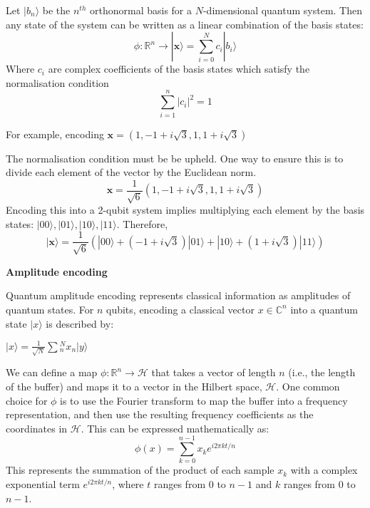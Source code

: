 Let $\vert b_n \rangle$ be the $n^{th}$ orthonormal basis for a $N$-dimensional quantum system.
Then any state of the system can be written as a linear combination of the basis states:
\begin{equation}
    \displaystyle{
        \phi: \mathbb{R}^n \rightarrow | \mathbf{x} \rangle =
        \sum_{i=0}^{N}
            c_i | b_i \rangle
    }
\end{equation}
Where $c_i$ are complex coefficients of the basis states which satisfy the normalisation condition
\begin{equation}
    \displaystyle{\sum_{i=1}^n |c_i|^2 = 1}
\end{equation}

For example, encoding $\mathbf{x} = (1, -1+i\sqrt{3}, 1, 1+i\sqrt{3})$

The normalisation condition must be be upheld. 
One way to ensure this is to divide each element of the vector by the Euclidean norm.
\begin{equation}
    \displaystyle{\mathbf{x} = \frac{1}{\sqrt{6}}(1, -1+i\sqrt{3}, 1, 1+i\sqrt{3})}
\end{equation}
Encoding this into a 2-qubit system implies multiplying each element by the basis states: $|00\rangle, |01\rangle, |10\rangle, |11\rangle$.
Therefore, 
\begin{equation}
    \displaystyle{
        | \mathbf{x} \rangle =
        \frac{1}{\sqrt{6}}
        (
            |00\rangle +
            (-1 + i\sqrt{3}) |01\rangle +
            |10\rangle +
            (1 + i\sqrt{3}) |11\rangle
        )
    }
\end{equation}


\textbf{Amplitude encoding}

Quantum amplitude encoding represents classical information as amplitudes of quantum states.
For $n$ qubits, encoding a classical vector $x \in \mathbb{C}^{n}$ into a quantum state $\vert x \rangle$ is described by:

$|x\rangle = \frac{1}{\sqrt{N}} \sum{_n^N}  x_n \vert y \rangle$


We can define a map $\phi: \mathbb{R}^n \rightarrow \mathcal{H}$ that takes a vector of length $n$ (i.e., the length of the buffer) and maps it to a vector in the Hilbert space, $\mathcal{H}$.
One common choice for $\phi$ is to use the Fourier transform to map the buffer into a frequency representation, and then use the resulting frequency coefficients as the coordinates in $\mathcal{H}$. This can be expressed mathematically as:
\begin{equation}
\phi(x) = \sum_{k=0}^{n-1} x_k e^{i2\pi k t / n}
\end{equation}
This represents the summation of the product of each sample $x_k$ with a complex exponential term $e^{i2\pi k t / n}$, where $t$ ranges from 0 to $n-1$ and $k$ ranges from 0 to $n-1$.



